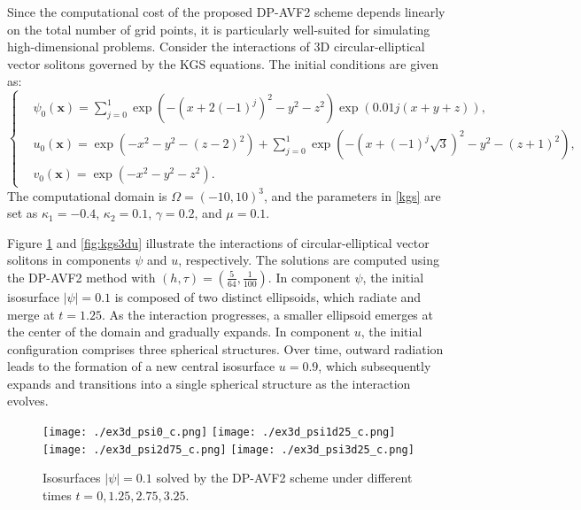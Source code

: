 \documentclass[fleqn,11pt]{elsarticle}
\numberwithin{equation}{section}
\begin{document}
Since the computational cost of the proposed DP-AVF2 scheme depends linearly on the total number of grid points, it is particularly well-suited for simulating high-dimensional problems. Consider the interactions of 3D circular-elliptical vector solitons governed by the KGS equations. The initial conditions are given as:
\[
\left\lbrace
\begin{aligned}
    & \psi_0(\bm{x}) = \sum_{j = 0}^1 \exp{\left( -\left(x + 2 (-1)^j\right)^2 - y^2 - z^2 \right)} \exp{\left(0.01j \left(x + y + z\right)\right)}, \\
    & u_0(\bm{x}) = \exp{\left(-x^2 - y^2 - (z-2)^2\right)} + \sum_{j = 0}^1 \exp{\left( -\left(x + (-1)^j \sqrt{3}\right)^2 - y^2 - \left(z + 1\right)^2 \right)}, \\
    & v_0(\bm{x}) = \exp{\left( -x^2 - y^2 - z^2 \right)}.
\end{aligned}
\right.
\]
The computational domain is $\Omega = (-10, 10)^3$, and the parameters in \eqref{kgs} are set as $\kappa_1 = -0.4$, $\kappa_2 = 0.1$, $\gamma = 0.2$, and $\mu = 0.1$.

Figure \ref{fig:kgs3dpsi} and \ref{fig:kgs3du} illustrate the interactions of circular-elliptical vector solitons in components $\psi$ and $u$, respectively. The solutions are computed using the DP-AVF2 method with $(h, \tau) = (\frac{5}{64}, \frac{1}{100})$. In component $\psi$, the initial isosurface $ |\psi| = 0.1 $ is composed of two distinct ellipsoids, which radiate and merge at $ t = 1.25 $. As the interaction progresses, a smaller ellipsoid emerges at the center of the domain and gradually expands. In component $u$, the initial configuration comprises three spherical structures. Over time, outward radiation leads to the formation of a new central isosurface $ u = 0.9 $, which subsequently expands and transitions into a single spherical structure as the interaction evolves.

\begin{figure}[H]
	\centering
		\texttt{[image: ./ex3d\_psi0\_c.png]}
		\texttt{[image: ./ex3d\_psi1d25\_c.png]}
		\texttt{[image: ./ex3d\_psi2d75\_c.png]}
		\texttt{[image: ./ex3d\_psi3d25\_c.png]}
	\caption{Isosurfaces $|\psi| = 0.1$ solved by the DP-AVF2 scheme under different times $t = 0, 1.25, 2.75, 3.25$.}\label{fig:kgs3dpsi}
\end{figure}
\end{document}
